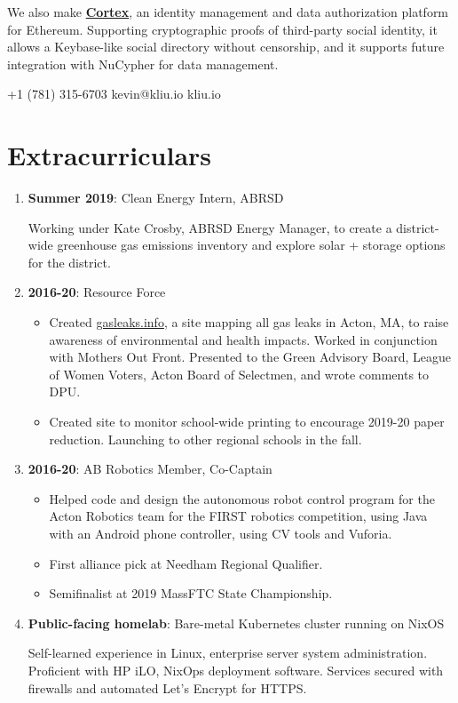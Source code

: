 \documentclass[paper=letter]{tccv}
\begin{document}
We also make \href{https://mycortex.tech}{\textbf{Cortex}}, an identity management and data authorization platform for Ethereum. Supporting cryptographic proofs of third-party social identity, it allows a Keybase-like social directory without censorship, and it supports future integration with NuCypher for data management.

    {+1 (781) 315-6703}
    {kevin@kliu.io}
    {kliu.io}

\section{Extracurriculars}

\begin{enumerate}
     \item \textbf{Summer 2019}: Clean Energy Intern, ABRSD
     
             Working under Kate Crosby, ABRSD Energy Manager, to create a district-wide greenhouse gas emissions inventory and explore solar + storage options for the district.
         \item \textbf{2016-20}: Resource Force
             \begin{itemize}
                \item Created \href{https://gasleaks.info}{gasleaks.info}, a site mapping all gas leaks in Acton, MA, to raise awareness of environmental and health impacts. Worked in conjunction with Mothers Out Front. Presented to the Green Advisory Board, League of Women Voters, Acton Board of Selectmen, and wrote comments to DPU.
                \item Created site to monitor school-wide printing to encourage 2019-20 paper reduction. Launching to other regional schools in the fall.
             \end{itemize}
      
         \item \textbf{2016-20}: AB Robotics Member, Co-Captain
             \begin{itemize}
                \item Helped code and design the autonomous robot control program for the Acton Robotics team for the FIRST robotics competition, using Java with an Android phone controller, using CV tools and Vuforia.
                \item First alliance pick at Needham Regional Qualifier.
                \item Semifinalist at 2019 MassFTC State Championship.
             \end{itemize}
    \item \textbf{Public-facing homelab}: Bare-metal Kubernetes cluster running on NixOS

    Self-learned experience in Linux, enterprise server system administration. Proficient with HP iLO, NixOps deployment software. Services secured with firewalls and automated Let's Encrypt for HTTPS.
     
\end{enumerate}
\end{document}
